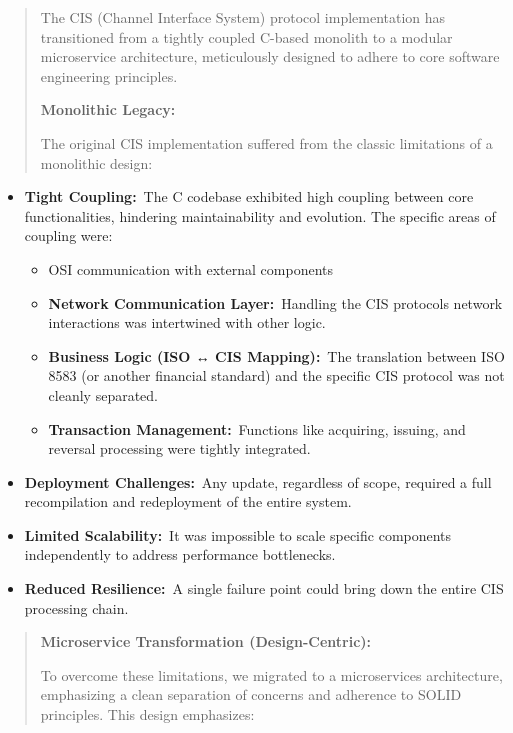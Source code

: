 \documentclass[12pt,a4paper]{report}
\begin{document}
\begin{quote}
The CIS (Channel Interface System) protocol implementation has
transitioned from a tightly coupled C-based monolith to a modular
microservice architecture, meticulously designed to adhere to core
software engineering principles.

\textbf{Monolithic Legacy:}

The original CIS implementation suffered from the classic limitations of
a monolithic design:
\end{quote}

\begin{itemize}
\item
  \textbf{Tight Coupling:}~The C codebase exhibited high coupling
  between core functionalities, hindering maintainability and evolution.
  The specific areas of coupling were:

  \begin{itemize}
  \item
    OSI communication with external components
  \item
    \textbf{Network Communication Layer:}~Handling the CIS
    protocol\textquotesingle s network interactions was intertwined with
    other logic.
  \item
    \textbf{Business Logic (ISO ↔ CIS Mapping):}~The translation between
    ISO 8583 (or another financial standard) and the specific CIS
    protocol was not cleanly separated.
  \item
    \textbf{Transaction Management:}~Functions like acquiring, issuing,
    and reversal processing were tightly integrated.
  \end{itemize}
\item
  \textbf{Deployment Challenges:}~Any update, regardless of scope,
  required a full recompilation and redeployment of the entire system.
\item
  \textbf{Limited Scalability:}~It was impossible to scale specific
  components independently to address performance bottlenecks.
\item
  \textbf{Reduced Resilience:}~A single failure point could bring down
  the entire CIS processing chain.
\end{itemize}

\begin{quote}
\textbf{Microservice Transformation (Design-Centric):}

To overcome these limitations, we migrated to a microservices
architecture, emphasizing a clean separation of concerns and adherence
to SOLID principles. This design emphasizes:
\end{quote}
\end{document}
